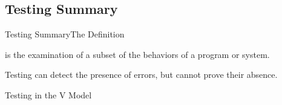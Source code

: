 \subsection{Testing Summary}

\begin{Frame}{Testing Summary}{The Definition}
  \begin{definition}[Testing]
     is the examination of \alert{a subset} of the behaviors of a program or system.
  \end{definition}

  \xxx

  Testing can detect the presence of errors, but cannot prove their absence.
\end{Frame}



\begin{Frame}[fragile]{Testing in the V Model}
  \newcommand{\define}[1]{\inhead{#1} \\ \scriptsize define test cases}
  \newcommand{\code}{\inhead{Coding} \\ \scriptsize write code}
  \newcommand{\run}[1]{\inhead{#1} \\ \scriptsize run test cases}


\end{Frame}
